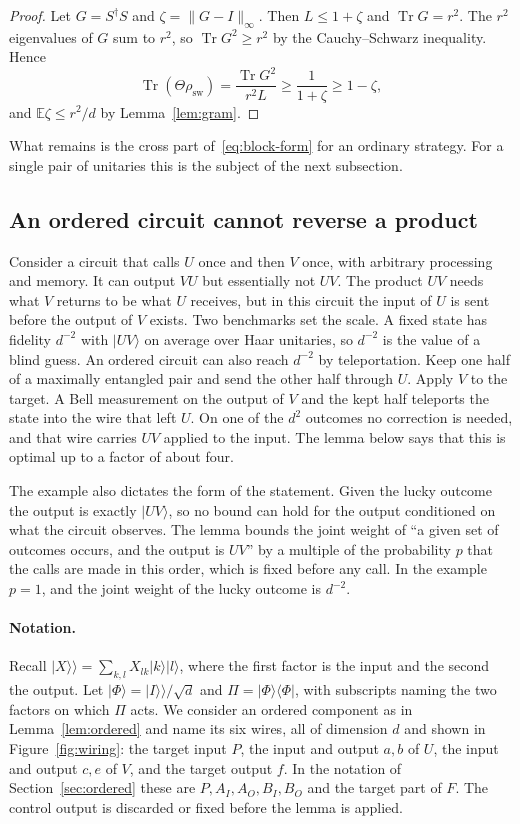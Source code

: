 \documentclass[11pt,letterpaper]{article}
\theoremstyle{definition}\newtheorem{definition}[theorem]{Definition}
\newcommand{\E}{\mathbb E}
\newcommand{\Tr}{\operatorname{Tr}}
\newcommand{\ket}[1]{\lvert#1\rangle}
\newcommand{\bra}[1]{\langle#1\rvert}
\newcommand{\proj}[1]{\ket{#1}\!\bra{#1}}
\newcommand{\vket}[1]{\lvert#1\rangle\!\rangle}
\newcommand{\norm}[1]{\lVert#1\rVert}
\newcommand{\reffig}[1]{Figure~\ref{#1}}
\begin{document}
\begin{proof}
Let $G=S^\dagger S$ and $\zeta=\norm{G-I}_\infty$. Then $L\le1+\zeta$
and $\Tr G=r^2$. The $r^2$ eigenvalues of $G$ sum to $r^2$, so
$\Tr G^2\ge r^2$ by the Cauchy--Schwarz inequality. Hence
\[
 \Tr(\Theta\rho_{\mathrm{sw}})=\frac{\Tr G^2}{r^2L}
 \ge\frac1{1+\zeta}\ge1-\zeta ,
\]
and $\E\zeta\le r^2/d$ by Lemma~\ref{lem:gram}.
\end{proof}

What remains is the cross part of~\eqref{eq:block-form} for an ordinary
strategy. For a single pair of unitaries this is the subject of the
next subsection.

\subsection{An ordered circuit cannot reverse a product}\label{sec:reverse}

Consider a circuit that calls $U$ once and then $V$ once, with
arbitrary processing and memory. It can output $VU$ but
essentially not $UV$. The product $UV$ needs what $V$ returns to be what $U$ receives,
but in this circuit the input of $U$ is sent before the output of $V$
exists. Two benchmarks set the scale. A fixed state has fidelity
$d^{-2}$ with $\ket{UV}$ on average over Haar unitaries, so $d^{-2}$ is
the value of a blind guess. An ordered circuit can also reach $d^{-2}$
by teleportation. Keep one half of a maximally entangled pair
and send the other half through $U$. Apply $V$ to the target. A Bell
measurement on the output of $V$ and the kept half teleports the state
into the wire that left $U$. On one of the $d^2$ outcomes no correction
is needed, and that wire carries $UV$ applied to the input. The lemma
below says that this is optimal up to a factor of about four.

The example also dictates the form of the statement. Given the lucky
outcome the output is exactly $\ket{UV}$, so no bound can hold for the
output conditioned on what the circuit observes. The lemma bounds the
joint weight of ``a given set of outcomes occurs, and the output is
$UV$''  by a multiple of the probability $p$ that the calls are made in
this order, which is fixed before any call. In the example $p=1$, and
the joint weight of the lucky outcome is $d^{-2}$.

\paragraph{Notation.}
Recall $\vket X=\sum_{k,l}X_{lk}\ket k\ket l$, where the first factor is
the input and the second the output. Let $\ket\Phi=\vket I/\sqrt d$ and
$\Pi=\proj\Phi$, with subscripts naming the two factors on which $\Pi$
acts. We consider an
ordered component as in Lemma~\ref{lem:ordered} and name its six wires,
all of dimension $d$ and shown in \reffig{fig:wiring}: the target input
$P$, the input and output $a,b$ of $U$, the input and output $c,e$ of
$V$, and the target output $f$. In the notation of
Section~\ref{sec:ordered} these are $P,A_I,A_O,B_I,B_O$ and the target
part of $F$. The control output is discarded or fixed before the lemma
is applied.
\end{document}
